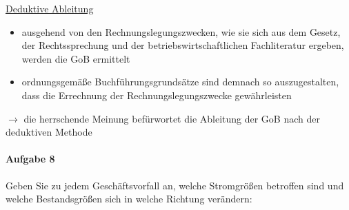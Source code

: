 \documentclass[paper=a4, fontsize=11pt]{scrartcl}
\numberwithin{equation}{section}
\numberwithin{figure}{section}
\numberwithin{table}{section}
\begin{document}
\underline{Deduktive Ableitung} 
\begin{itemize}
\item ausgehend von den Rechnungslegungszwecken, wie sie sich aus dem Gesetz, der Rechtssprechung und der betriebswirtschaftlichen Fachliteratur ergeben, werden die GoB ermittelt
\item ordnungsgemäße Buchführungsgrundsätze sind demnach so auszugestalten, dass die Errechnung der Rechnungslegungszwecke gewährleisten 
\end{itemize}

$\rightarrow$ die herrschende Meinung befürwortet die Ableitung der GoB nach der deduktiven Methode

\paragraph{Aufgabe 8}
Geben Sie zu jedem Geschäftsvorfall an, welche Stromgrößen betroffen sind und welche Bestandsgrößen sich in welche Richtung verändern: \\
\end{document}

